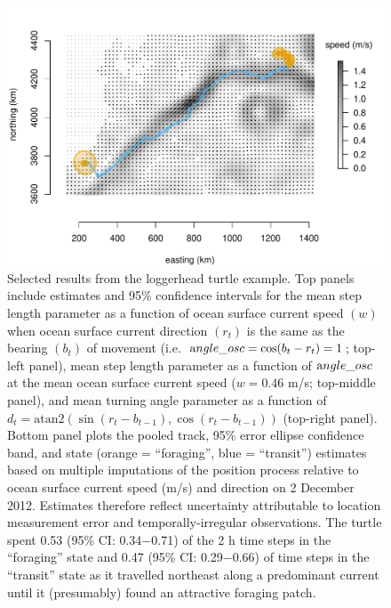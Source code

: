 \documentclass[12pt]{article}\usepackage[]{graphicx}\usepackage[]{color}
\begin{document}
\begin{figure}[htbp]
    \includegraphics[width=\textwidth]{plot_turtleResults2.pdf}
  \caption{Selected results from the loggerhead turtle example. Top panels include estimates and 95\% confidence intervals for the mean step length parameter as a function of ocean surface current speed $(w)$ when ocean surface current direction $(r_t)$ is the same as the bearing $(b_t)$ of movement (i.e.\ ${\text angle\_osc}=\cos(b_t-r_t)=1$; top-left panel), mean step length parameter as a function of ${\text angle\_osc}$ at the mean ocean surface current speed ($w=0.46$ m/s; top-middle panel), and mean turning angle parameter as a function of $d_t=\text{atan2}(\sin(r_t-b_{t-1}),\cos(r_t-b_{t-1}))$ (top-right panel). Bottom panel plots the pooled track, 95\% error ellipse confidence band, and state (orange = ``foraging'', blue = ``transit'') estimates based on multiple imputations of the position process relative to ocean surface current speed (m/s) and direction on 2 December 2012. Estimates therefore reflect uncertainty attributable to location measurement error and temporally-irregular observations. The turtle spent 0.53 (95\% CI: 0.34$-$0.71) of the 2 h time steps in the ``foraging'' state and 0.47 (95\% CI: 0.29$-$0.66) of time steps in the ``transit'' state as it travelled northeast along a predominant current until it (presumably) found an attractive foraging patch.}
  \label{fig:turtleResults}
\end{figure}
\end{document}
